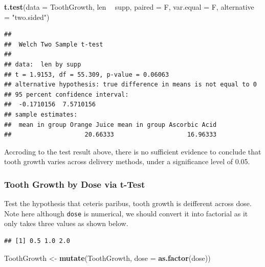 \documentclass[]{article}
\newenvironment{Shaded}{\begin{snugshade}}{\end{snugshade}}
\newcommand{\KeywordTok}[1]{\textcolor[rgb]{0.13,0.29,0.53}{\textbf{#1}}}
\newcommand{\DataTypeTok}[1]{\textcolor[rgb]{0.13,0.29,0.53}{#1}}
\newcommand{\StringTok}[1]{\textcolor[rgb]{0.31,0.60,0.02}{#1}}
\newcommand{\ControlFlowTok}[1]{\textcolor[rgb]{0.13,0.29,0.53}{\textbf{#1}}}
\newcommand{\OperatorTok}[1]{\textcolor[rgb]{0.81,0.36,0.00}{\textbf{#1}}}
\newcommand{\NormalTok}[1]{#1}
\begin{document}
\begin{Shaded}
\begin{Highlighting}[]
\KeywordTok{t.test}\NormalTok{(}\DataTypeTok{data =}\NormalTok{ ToothGrowth, len }\OperatorTok{~}\StringTok{ }\NormalTok{supp, }\DataTypeTok{paired =}\NormalTok{ F, }\DataTypeTok{var.equal =}\NormalTok{ F, }\DataTypeTok{alternative =} \StringTok{"two.sided"}\NormalTok{)}
\end{Highlighting}
\end{Shaded}

\begin{verbatim}
## 
##  Welch Two Sample t-test
## 
## data:  len by supp
## t = 1.9153, df = 55.309, p-value = 0.06063
## alternative hypothesis: true difference in means is not equal to 0
## 95 percent confidence interval:
##  -0.1710156  7.5710156
## sample estimates:
##  mean in group Orange Juice mean in group Ascorbic Acid 
##                    20.66333                    16.96333
\end{verbatim}

Accroding to the test result above, there is no sufficient evidence to
conclude that tooth growth varies across delivery methods, under a
significance level of 0.05.

\subsubsection{Tooth Growth by Dose via
t-Test}\label{tooth-growth-by-dose-via-t-test}

Test the hypothesis that ceteris paribus, tooth growth is deifferent
across dose. Note here although \texttt{dose} is numerical, we should
convert it into factorial as it only takes three values as shown below.

\begin{Shaded}
\end{Shaded}

\begin{verbatim}
## [1] 0.5 1.0 2.0
\end{verbatim}

\begin{Shaded}
\begin{Highlighting}[]
\NormalTok{ToothGrowth <-}\StringTok{ }\KeywordTok{mutate}\NormalTok{(ToothGrowth, }\DataTypeTok{dose =} \KeywordTok{as.factor}\NormalTok{(dose))}
\end{Highlighting}
\end{Shaded}
\end{document}

